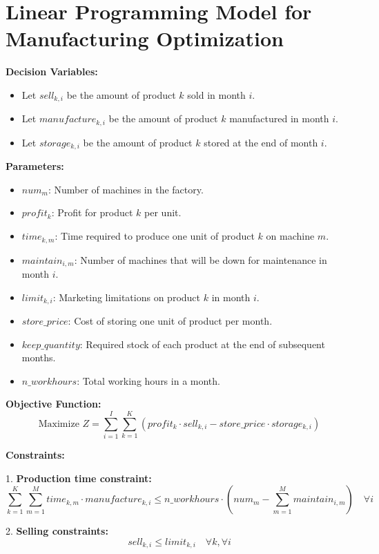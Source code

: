 \documentclass{article}
\begin{document}
\section*{Linear Programming Model for Manufacturing Optimization}

\textbf{Decision Variables:}
\begin{itemize}
    \item Let \( sell_{k,i} \) be the amount of product \( k \) sold in month \( i \).
    \item Let \( manufacture_{k,i} \) be the amount of product \( k \) manufactured in month \( i \).
    \item Let \( storage_{k,i} \) be the amount of product \( k \) stored at the end of month \( i \).
\end{itemize}

\textbf{Parameters:}
\begin{itemize}
    \item \( num_{m} \): Number of machines in the factory.
    \item \( profit_{k} \): Profit for product \( k \) per unit.
    \item \( time_{k,m} \): Time required to produce one unit of product \( k \) on machine \( m \).
    \item \( maintain_{i,m} \): Number of machines that will be down for maintenance in month \( i \).
    \item \( limit_{k,i} \): Marketing limitations on product \( k \) in month \( i \).
    \item \( store\_price \): Cost of storing one unit of product per month.
    \item \( keep\_quantity \): Required stock of each product at the end of subsequent months.
    \item \( n\_workhours \): Total working hours in a month.
\end{itemize}

\textbf{Objective Function:}
\[
\text{Maximize } Z = \sum_{i=1}^{I} \sum_{k=1}^{K} \left( profit_{k} \cdot sell_{k,i} - store\_price \cdot storage_{k,i} \right)
\]

\textbf{Constraints:}

1. \textbf{Production time constraint:}
\[
\sum_{k=1}^{K} \sum_{m=1}^{M} time_{k,m} \cdot manufacture_{k,i} \leq n\_workhours \cdot (num_{m} - \sum_{m=1}^{M} maintain_{i,m}) \quad \forall i
\]

2. \textbf{Selling constraints:}
\[
sell_{k,i} \leq limit_{k,i} \quad \forall k, \forall i
\]
\end{document}
